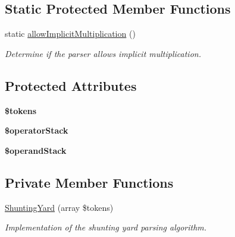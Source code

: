 \subsection*{Static Protected Member Functions}
\begin{DoxyCompactItemize}
\item 
static \hyperlink{classMathParser_1_1Parsing_1_1Parser_ab559cd696a23ad1eeddb69eb6a56a067}{allow\-Implicit\-Multiplication} ()
\begin{DoxyCompactList}\small\item\em Determine if the parser allows implicit multiplication. \end{DoxyCompactList}\end{DoxyCompactItemize}
\subsection*{Protected Attributes}
\begin{DoxyCompactItemize}
\item 
\hypertarget{classMathParser_1_1Parsing_1_1Parser_ab20fd2f0971594016b8b631d29532284}{{\bfseries \$tokens}}\label{classMathParser_1_1Parsing_1_1Parser_ab20fd2f0971594016b8b631d29532284}

\item 
\hypertarget{classMathParser_1_1Parsing_1_1Parser_a6a691e6b115de82b04fa5b2fc828721b}{{\bfseries \$operator\-Stack}}\label{classMathParser_1_1Parsing_1_1Parser_a6a691e6b115de82b04fa5b2fc828721b}

\item 
\hypertarget{classMathParser_1_1Parsing_1_1Parser_a761f3ca46141d5e39e620520a2a876fa}{{\bfseries \$operand\-Stack}}\label{classMathParser_1_1Parsing_1_1Parser_a761f3ca46141d5e39e620520a2a876fa}

\end{DoxyCompactItemize}
\subsection*{Private Member Functions}
\begin{DoxyCompactItemize}
\item 
\hyperlink{classMathParser_1_1Parsing_1_1Parser_a5e95881d4b53730565bf2205fa621086}{Shunting\-Yard} (array \$tokens)
\begin{DoxyCompactList}\small\item\em Implementation of the shunting yard parsing algorithm. \end{DoxyCompactList}\end{DoxyCompactItemize}


